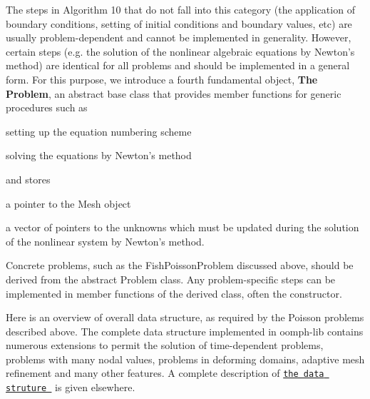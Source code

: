 \begin{DoxyItemize}
The steps in Algorithm 10 that do not fall into this category (the application of boundary conditions, setting of initial conditions and boundary values, etc) are usually problem-\/dependent and cannot be implemented in generality. However, certain steps (e.\-g. the solution of the nonlinear algebraic equations by Newton's method) are identical for all problems and should be implemented in a general form. For this purpose, we introduce a fourth fundamental object, {\bfseries The} {\bfseries Problem}, an abstract base class that provides member functions for generic procedures such as
\begin{DoxyItemize}
\item setting up the equation numbering scheme
\item solving the equations by Newton's method
\end{DoxyItemize}

and stores
\begin{DoxyItemize}
\item a pointer to the Mesh object
\item a vector of pointers to the unknowns which must be updated during the solution of the nonlinear system by Newton's method.
\end{DoxyItemize}

Concrete problems, such as the {\ttfamily Fish\-Poisson\-Problem} discussed above, should be derived from the abstract {\ttfamily Problem} class. Any problem-\/specific steps can be implemented in member functions of the derived class, often the constructor.
\end{DoxyItemize}

Here is an overview of overall data structure, as required by the Poisson problems described above. The complete data structure implemented in {\ttfamily oomph-\/lib} contains numerous extensions to permit the solution of time-\/dependent problems, problems with many nodal values, problems in deforming domains, adaptive mesh refinement and many other features. A complete description of \href{../../the_data_structure/html/index.html}{\tt the data struture } is given elsewhere.


